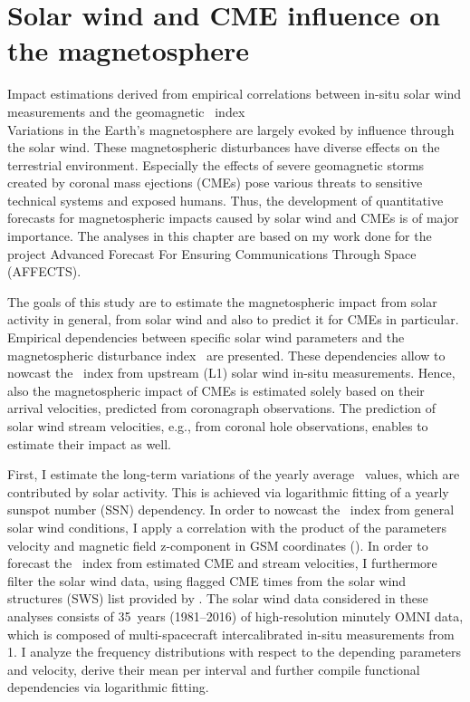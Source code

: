 
\chapter{Solar wind and CME influence on the magnetosphere}
\label{chap:chapter2}

Impact estimations derived from empirical correlations between in-situ solar wind measurements and the geomagnetic \Kp{}~index\\


Variations in the Earth's magnetosphere are largely evoked by influence through the solar wind. These magnetospheric disturbances have diverse effects on the terrestrial environment. Especially the effects of severe geomagnetic storms created by coronal mass ejections (CMEs) pose various threats to sensitive technical systems and exposed humans. Thus, the development of quantitative forecasts for magnetospheric impacts caused by solar wind and CMEs is of major importance. The analyses in this chapter are based on my work done for the project Advanced Forecast For Ensuring Communications Through Space (AFFECTS).

The goals of this study are to estimate the magnetospheric impact from solar activity in general, from solar wind and also to predict it for CMEs in particular. Empirical dependencies between specific solar wind parameters and the magnetospheric disturbance index~\Kp{} are presented. These dependencies allow to nowcast the \Kp~index from upstream (L1) solar wind in-situ measurements. Hence, also the magnetospheric impact of CMEs is estimated solely based on their arrival velocities, predicted from coronagraph observations. The prediction of solar wind stream velocities, e.g., from coronal hole observations, enables to estimate their impact as well.

First, I estimate the long-term variations of the yearly average \Kp{}~values, which are contributed by solar activity. This is achieved via logarithmic fitting of a yearly sunspot number (SSN) dependency. In order to nowcast the \Kp~index from general solar wind conditions, I apply a correlation with the product of the parameters velocity and magnetic field z-component in GSM coordinates (\vBz{}). In order to forecast the \Kp~index from estimated CME and stream velocities, I furthermore filter the solar wind data, using flagged CME times from the solar wind structures (SWS) list provided by \citet{Richardson2012}. The solar wind data considered in these analyses consists of 35~years (1981--2016) of high-resolution minutely OMNI data, which is composed of multi-spacecraft intercalibrated in-situ measurements from \SI{1}{\au}. I analyze the \Kp{} frequency distributions with respect to the depending parameters \vBz{} and velocity, derive their mean \Kp{} per interval and further compile functional dependencies via logarithmic fitting.

